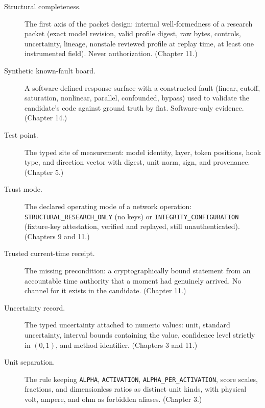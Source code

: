\begin{description}
\item[Structural completeness.] The first axis of the packet design: internal well-formedness of a research packet (exact model revision, valid profile digest, raw bytes, controls, uncertainty, lineage, nonstale reviewed profile at replay time, at least one instrumented field). Never authorization. (Chapter 11.)

\item[Synthetic known-fault board.] A software-defined response surface with a constructed fault (linear, cutoff, saturation, nonlinear, parallel, confounded, bypass) used to validate the candidate's code against ground truth by fiat. Software-only evidence. (Chapter 14.)

\item[Test point.] The typed site of measurement: model identity, layer, token positions, hook type, and direction vector with digest, unit norm, sign, and provenance. (Chapter 5.)

\item[Trust mode.] The declared operating mode of a network operation: \texttt{STRUCTURAL\_RESEARCH\_ONLY} (no keys) or \texttt{INTEGRITY\_CONFIGURATION} (fixture-key attestation, verified and replayed, still unauthenticated). (Chapters 9 and 11.)

\item[Trusted current-time receipt.] The missing precondition: a cryptographically bound statement from an accountable time authority that a moment had genuinely arrived. No channel for it exists in the candidate. (Chapter 11.)

\item[Uncertainty record.] The typed uncertainty attached to numeric values: unit, standard uncertainty, interval bounds containing the value, confidence level strictly in $(0,1)$, and method identifier. (Chapters 3 and 11.)

\item[Unit separation.] The rule keeping \texttt{ALPHA}, \texttt{ACTIVATION}, \texttt{ALPHA\_PER\_ACTIVATION}, score scales, fractions, and dimensionless ratios as distinct unit kinds, with physical volt, ampere, and ohm as forbidden aliases. (Chapter 3.)

\end{description}
